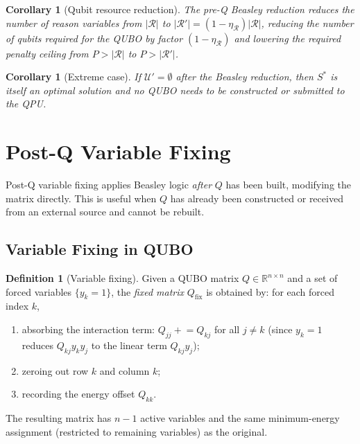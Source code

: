 \documentclass[11pt,a4paper]{article}
\theoremstyle{plain}
\newtheorem{corollary}[theorem]{Corollary}
\theoremstyle{definition}
\newtheorem{definition}[theorem]{Definition}
\theoremstyle{remark}
\newcommand{\U}{\mathcal{U}}
\newcommand{\R}{\mathcal{R}}
\newcommand{\Sstar}{S^{*}}
\newcommand{\QUBO}{\textup{QUBO}}
\newcommand{\abs}[1]{\lvert #1 \rvert}
\newcommand{\set}[1]{\{#1\}}
\newcommand{\etaR}{\eta_{\mathcal{R}}}
\begin{document}
\begin{corollary}[Qubit resource reduction]
The pre-Q Beasley reduction reduces the number of reason variables from $\abs{\R}$
to $\abs{\R'} = (1 - \etaR)\abs{\R}$, reducing the number of qubits required for
the \QUBO{} by factor $(1 - \etaR)$ and lowering the required penalty ceiling from
$P > \abs{\R}$ to $P > \abs{\R'}$.
\end{corollary}

\begin{corollary}[Extreme case]
If $\U' = \emptyset$ after the Beasley reduction, then $\Sstar$ is itself an optimal
solution and no \QUBO{} needs to be constructed or submitted to the QPU.
\end{corollary}

\section{Post-Q Variable Fixing}
\label{sec:postq}

Post-Q variable fixing applies Beasley logic \emph{after} $Q$ has been built,
modifying the matrix directly.
This is useful when $Q$ has already been constructed or received from an external
source and cannot be rebuilt.

\subsection{Variable Fixing in QUBO}

\begin{definition}[Variable fixing]
Given a \QUBO{} matrix $Q \in \mathbb{R}^{n \times n}$ and a set of forced variables
$\set{y_k = 1}$, the \emph{fixed matrix} $Q_{\text{fix}}$ is obtained by:
for each forced index $k$,
\begin{enumerate}[label=(\roman*)]
  \item absorbing the interaction term: $Q_{jj} \mathrel{+}= Q_{kj}$ for all $j \neq k$
        (since $y_k = 1$ reduces $Q_{kj} y_k y_j$ to the linear term $Q_{kj} y_j$);
  \item zeroing out row $k$ and column $k$;
  \item recording the energy offset $Q_{kk}$.
\end{enumerate}
The resulting matrix has $n - 1$ active variables and the same minimum-energy
assignment (restricted to remaining variables) as the original.
\end{definition}
\end{document}
